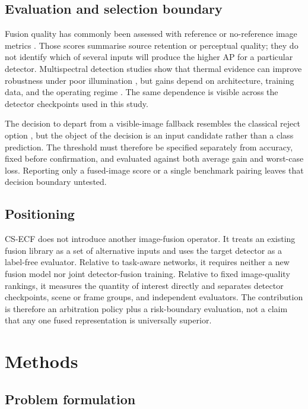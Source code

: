 \documentclass[preprint,11pt]{elsarticle}
\begin{document}
\subsection{Evaluation and selection boundary}

Fusion quality has commonly been assessed with reference or no-reference image
metrics \cite{ma2019survey,mudavath2026review}. Those scores summarise source
retention or perceptual quality; they do not identify which of several inputs
will produce the higher AP for a particular detector. Multispectral
detection studies show that thermal evidence can improve robustness under
poor illumination \cite{li2010thermal,guo2024prior}, but gains depend on
architecture, training data, and the operating regime
\cite{abdar2021uncertainty,gawlikowski2023uncertainty}. The same dependence is
visible across the detector checkpoints used in this study.

The decision to depart from a visible-image fallback resembles the classical
reject option \cite{chow1970reject}, but the object of the decision is an input
candidate rather than a class prediction. The threshold must therefore be
specified separately from accuracy, fixed before confirmation, and evaluated
against both average gain and worst-case loss. Reporting only a fused-image
score or a single benchmark pairing leaves that decision boundary untested.

\subsection{Positioning}

CS-ECF does not introduce another image-fusion operator. It treats an existing
fusion library as a set of alternative inputs and uses the target detector as a
label-free evaluator. Relative to task-aware networks, it requires neither a
new fusion model nor joint detector-fusion training. Relative to fixed
image-quality rankings, it measures the quantity of interest directly and
separates detector checkpoints, scene or frame groups, and independent
evaluators. The contribution is therefore an arbitration policy plus a
risk-boundary evaluation, not a claim that any one fused representation is
universally superior.

\section{Methods}

\subsection{Problem formulation}
\end{document}
